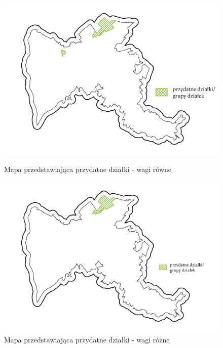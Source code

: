 \documentclass{article}
\begin{document}
\begin{figure}[H]
    \begin{minipage}[t]{0.48\textwidth}
        \centering
        \includegraphics[width=\linewidth]{img/przydatne-dzialki.jpg}
        \caption{Mapa przedstawiająca przydatne działki - wagi równe}
        \label{fig:przydatne-dzialki-rowne}
    \end{minipage}
    \hfill
    \begin{minipage}[t]{0.48\textwidth}
        \centering
        \includegraphics[width=\linewidth]{img/roznewagi-przydatne-dzialki.jpg}
        \caption{Mapa przedstawiająca przydatne działki - wagi różne}
        \label{fig:przydatne-dzialki-rozne}
    \end{minipage}
\end{figure}
\end{document}
